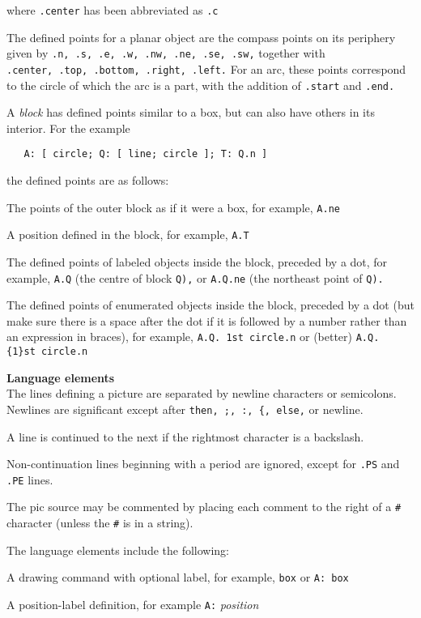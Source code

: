 where
{\tt .center}
has been abbreviated as
{\tt .c}

The defined points for a planar object are the compass points
on its periphery given by
{\tt .n,\ .s,\ .e,\ .w,\ .nw,\ .ne,\ .se,\ .sw,}
together with
{\tt .center,\ .top,\ .bottom,\ .right,\ .left.}
For an arc, these points correspond to the circle of which the arc is a
part, with the addition of
{\tt .start}
and
{\tt .end.}

A
{\it block}
has defined points similar to a box, but can also have others in its
interior.
For the example

{\tt \ \ \ A:\ [\ circle;\ Q:\ [\ line;\ circle\ ];\ T:\ Q.n\ ]}

the defined points are as follows:

   The points of the outer block as if it were a box, for
   example,
{\tt A.ne}

   A position defined in the block, for example,
{\tt A.T}

   The defined points of labeled objects inside the block,
   preceded by a dot, for example,
{\tt A.Q}
(the centre of
   block
{\tt Q),}
or
{\tt A.Q.ne}
(the northeast point of
{\tt Q).}

   The defined points of enumerated objects inside the
   block, preceded by a dot (but make sure there is a space
   after the dot if it is followed by a number rather than
   an expression in braces), for example,
{\tt A.Q.\ 1st\ circle.n}
   or (better)
{\tt A.Q.\{1\}st\ circle.n}
\par\hskip-2pc{\bf Language elements}\\
The lines defining a picture are separated by newline characters
or semicolons.
Newlines are significant except after
{\tt then,\ ;,\ :,\ \{,\ else,}
or newline.

A line is continued to the next if the rightmost character is a backslash.

Non-continuation lines beginning with a period are ignored, except for
{\tt .PS}
and
{\tt .PE}
lines.

The
pic
source may be commented by placing each comment to the right of a
{\tt \#}
character (unless the
{\tt \#}
is in a string).

The language elements include the following:

   A drawing command with optional label, for example,
{\tt box}
or
{\tt A:\ box}

   A position-label definition, for example
{\tt A:}
{\it position}


